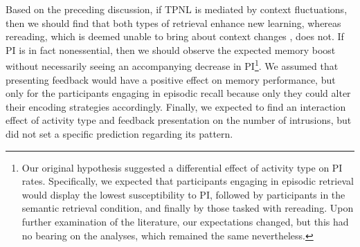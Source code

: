 \documentclass[../main.tex]{subfiles}
\begin{document}
Based on the preceding discussion, if TPNL is 
mediated by context 
fluctuations, then we should find that both types of 
retrieval enhance new 
learning, whereas rereading, which is deemed unable to 
bring about context 
changes \citep{chanRetrievalPotentiatesNew2018}, does 
not. If PI is in fact 
nonessential, then we should observe the expected 
memory boost without 
necessarily seeing an accompanying decrease in 
PI\footnote{Our original 
hypothesis suggested a differential effect of 
activity type on PI rates. 
Specifically, we expected that participants engaging 
in episodic retrieval 
would display the lowest susceptibility to PI, 
followed by participants in 
the semantic retrieval condition, and finally by 
those tasked with 
rereading. Upon further examination of the literature, 
our expectations 
changed, but this had no bearing on the analyses, 
which remained the same 
nevertheless.}. We assumed that presenting feedback 
would have a positive 
effect on memory performance, but only for the 
participants engaging in 
episodic recall because only they could alter their 
encoding strategies 
accordingly. Finally, we expected to find an 
interaction effect of activity 
type and feedback presentation on the number of 
intrusions, but did not set 
a specific prediction regarding its pattern.


{
	\biblio
}
\end{document}
